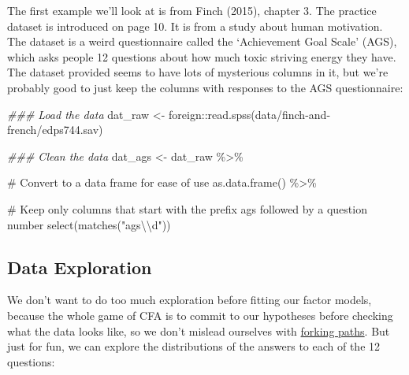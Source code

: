 \documentclass[
  letterpaper,
  DIV=11,
  numbers=noendperiod]{scrreprt}
\newenvironment{Shaded}{\begin{snugshade}}{\end{snugshade}}
\newcommand{\CommentTok}[1]{\textcolor[rgb]{0.37,0.37,0.37}{#1}}
\newcommand{\DocumentationTok}[1]{\textcolor[rgb]{0.37,0.37,0.37}{\textit{#1}}}
\newcommand{\FunctionTok}[1]{\textcolor[rgb]{0.28,0.35,0.67}{#1}}
\newcommand{\NormalTok}[1]{\textcolor[rgb]{0.00,0.23,0.31}{#1}}
\newcommand{\OtherTok}[1]{\textcolor[rgb]{0.00,0.23,0.31}{#1}}
\newcommand{\SpecialCharTok}[1]{\textcolor[rgb]{0.37,0.37,0.37}{#1}}
\newcommand{\StringTok}[1]{\textcolor[rgb]{0.13,0.47,0.30}{#1}}
\begin{document}
The first example we'll look at is from Finch (2015), chapter 3. The
practice dataset is introduced on page 10. It is from a study about
human motivation. The dataset is a weird questionnaire called the
`Achievement Goal Scale' (AGS), which asks people 12 questions about how
much toxic striving energy they have. The dataset provided seems to have
lots of mysterious columns in it, but we're probably good to just keep
the columns with responses to the AGS questionnaire:

\begin{Shaded}
\begin{Highlighting}[]
\DocumentationTok{\#\#\# Load the data}
\NormalTok{dat\_raw }\OtherTok{\textless{}{-}}\NormalTok{ foreign}\SpecialCharTok{::}\FunctionTok{read.spss}\NormalTok{(}\StringTok{\textquotesingle{}data/finch{-}and{-}french/edps744.sav\textquotesingle{}}\NormalTok{) }
  
\DocumentationTok{\#\#\# Clean the data}
\NormalTok{dat\_ags }\OtherTok{\textless{}{-}}\NormalTok{ dat\_raw }\SpecialCharTok{\%\textgreater{}\%} 

  \CommentTok{\# Convert to a data frame for ease of use}
  \FunctionTok{as.data.frame}\NormalTok{() }\SpecialCharTok{\%\textgreater{}\%} 
  
  \CommentTok{\# Keep only columns that start with the prefix \textquotesingle{}ags\textquotesingle{} followed by a question number}
  \FunctionTok{select}\NormalTok{(}\FunctionTok{matches}\NormalTok{(}\StringTok{"ags}\SpecialCharTok{\textbackslash{}\textbackslash{}}\StringTok{d"}\NormalTok{)) }
\end{Highlighting}
\end{Shaded}

\hypertarget{data-exploration}{%
\subsection*{Data Exploration}\label{data-exploration}}

We don't want to do too much exploration before fitting our factor
models, because the whole game of CFA is to commit to our hypotheses
before checking what the data looks like, so we don't mislead ourselves
with
\href{http://www.stat.columbia.edu/~gelman/research/unpublished/p_hacking.pdf}{forking
paths}. But just for fun, we can explore the distributions of the
answers to each of the 12 questions:
\end{document}
